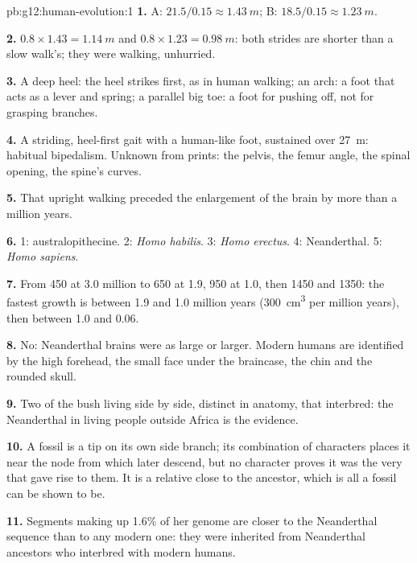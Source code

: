 \begin{solution}{pb:g12:human-evolution:1}
\textbf{1.} A: $21.5/0.15 \approx \qty{1.43}{m}$; B: $18.5/0.15
\approx \qty{1.23}{m}$.

\textbf{2.} $0.8 \times 1.43 = \qty{1.14}{m}$ and $0.8 \times 1.23 =
\qty{0.98}{m}$: both strides are shorter than a slow walk's; they were
walking, unhurried.

\textbf{3.} A deep heel: the heel strikes first, as in human walking;
an arch: a foot that acts as a lever and spring; a parallel big toe:
a foot for pushing off, not for grasping branches.

\textbf{4.} A striding, heel-first gait with a human-like foot,
sustained over \qty{27}{m}: habitual bipedalism. Unknown from prints:
the pelvis, the femur angle, the spinal opening, the spine's curves.

\textbf{5.} That upright walking preceded the enlargement of the
brain by more than a million years.

\textbf{6.} 1: australopithecine. 2: \emph{Homo habilis}. 3: \emph{Homo
erectus}. 4: Neanderthal. 5: \emph{Homo sapiens}.

\textbf{7.} From 450 at 3.0 million to 650 at 1.9, 950 at 1.0, then
1450 and 1350: the fastest growth is between 1.9 and 1.0 million
years (\qty{300}{cm^3} per million years), then between 1.0 and 0.06.

\textbf{8.} No: Neanderthal brains were as large or larger. Modern
humans are identified by the high forehead, the small face under the
braincase, the chin and the rounded skull.

\textbf{9.} Two  of the bush living side by side, distinct
in anatomy, that interbred: the Neanderthal  in living people
outside Africa is the evidence.

\textbf{10.} A fossil is a tip on its own side branch; its combination
of characters places it near the node from which later 
descend, but no character proves it was the very  that
gave rise to them. It is a relative close to the ancestor, which is
all a fossil can be shown to be.

\textbf{11.} Segments making up 1.6\% of her genome are closer to the
Neanderthal sequence than to any modern one: they were inherited from
Neanderthal ancestors who interbred with modern humans.


\end{solution}
